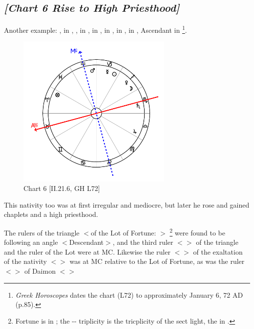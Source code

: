 \subsection*{\textit{[Chart 6 Rise to High Priesthood]}}

Another example: \Sun, \Mercury\xspace in \Capricorn, \Moon, \Venus\xspace in \Sagittarius, \Saturn\xspace in \Scorpio,
\Jupiter\xspace in \Libra, \Mars\xspace in \Aquarius, \Fortune \xspace in \Aries, Ascendant in \Taurus
\footnote{\textit{Greek Horoscopes} dates the chart (L72) to approximately January 6, 72 AD (p.85).}.

\clearpage
\begin{figure}
\centering
\vspace{-20pt}
\includegraphics[width=0.68\textwidth]{charts/2_21_6}
\caption{Chart 6 [II.21.6, GH L72]}
\label{fig:chart06}
\end{figure}

This nativity too was at first irregular and mediocre, but later he rose and gained chaplets and a high priesthood. 

The rulers of the triangle $<$of the Lot of Fortune: \Taurus\xspace \Virgo\xspace \Capricorn$>$
\footnote{Fortune is in \Aries; the \Taurus-\Virgo-\Capricorn\xspace triplicity is the tricplicity of the sect light, the \Sun\xspace in \Capricorn\xspace.}  were found to be following an angle $<$Descendant$>$, and the third ruler $<$\Mars$>$ of the triangle and the ruler of the Lot were at MC. Likewise the ruler $<$\Sun$>$ of the exaltation of the nativity $<$\Leo$>$ was at MC relative to the Lot of Fortune, as was the ruler $<$\Mercury$>$ of Daimon $<$\Gemini$>$

